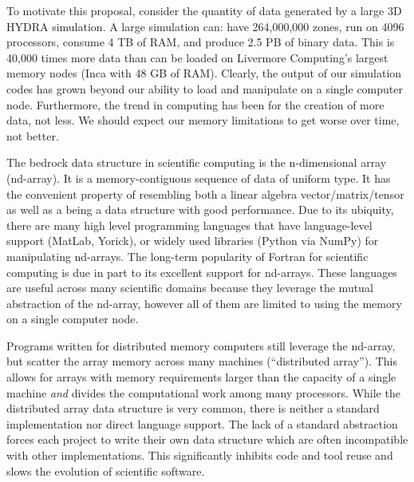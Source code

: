 \documentclass[letterpaper,11pt]{article}
\begin{document}
To motivate this proposal, consider the quantity of data generated
by a large 3D HYDRA simulation.  A large simulation can:
have
	264,000,000 zones,
run on 
	4096 processors,
consume 
	4 TB of RAM, and
produce 
	2.5 PB of binary data.
This is 40,000 times more data than can be loaded on Livermore Computing's largest memory nodes (Inca with 48 GB of RAM).%
Clearly, the output of our simulation codes has grown
beyond our ability to load and manipulate on a single computer node.
Furthermore, the trend in computing has been for the creation of more data, not less.  We should
expect our memory limitations to get worse over time, not better.

The bedrock data structure in scientific computing is the n-dimensional array (nd-array).  
It is a memory-contiguous sequence of data of uniform type.  It has the convenient property 
of resembling both a linear algebra vector/matrix/tensor as well as a being a data structure
with good performance.  Due to its ubiquity, there are many high level programming 
languages that have language-level support (MatLab\cite{matlab}, Yorick\cite{Munro1995}), 
or widely used libraries (Python\cite{CPython} via NumPy\cite{Oliphant2006}) for 
manipulating nd-arrays.  The long-term popularity of Fortran for scientific computing is 
due in part to its excellent support for nd-arrays.  These languages are useful across 
many scientific domains because they leverage the mutual abstraction of the nd-array, however
all of them are limited to using the memory on a single computer node.

Programs written for distributed memory computers still leverage the nd-array, but scatter 
the array memory across many machines (``distributed array'').  This allows for arrays 
with memory requirements larger than the capacity of a single machine \emph{and} divides 
the computational work among many processors.  While the distributed array data structure 
is very common, there is neither a standard implementation nor direct language support.  
The lack of a standard abstraction forces each project to write their own data structure 
which are often incompatible with other implementations.  This significantly inhibits code
and tool reuse and slows the evolution of scientific software.
\end{document}
